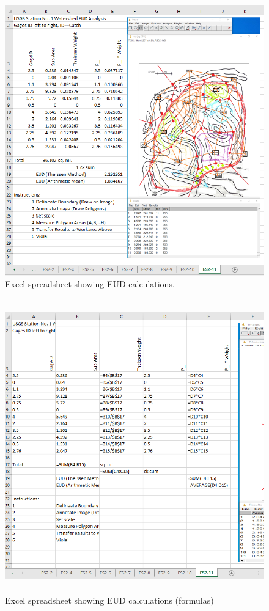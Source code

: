 \documentclass[12pt]{article}
\begin{document}
\begin{enumerate}
\begin{figure}[h!] %
   \centering
   \includegraphics[width=5in]{es2-11xls.png} 
   \caption{Excel spreadsheet showing EUD calculations.}
   \label{fig:es2-11xls}
\end{figure}
\clearpage

\begin{figure}[h!] %
   \centering
   \includegraphics[height=5in]{es2-11func.png} 
   \caption{Excel spreadsheet showing EUD calculations (formulas)}
   \label{fig:es2-11func}
\end{figure}
    
\end{enumerate}
\end{document}
